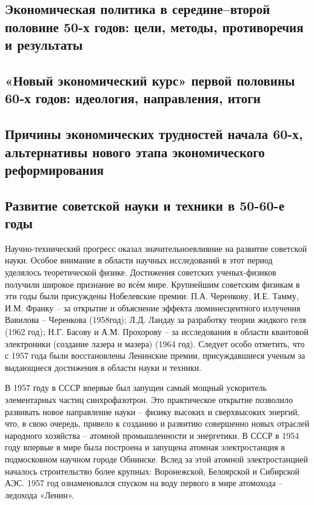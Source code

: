 \documentclass{article}
\begin{document}
\pagebreak
\subsection{Экономическая политика в середине–второй половине 50-х годов: цели, методы, противоречия и результаты}

\pagebreak
\subsection{«Новый экономический курс» первой половины 60-х годов: идеология, направления, итоги}

\pagebreak
\subsection{Причины экономических трудностей начала 60-х, альтернативы нового этапа экономического реформирования}

\pagebreak
\subsection{Развитие советской науки и техники в 50-60-е годы}

Научно-технический прогресс оказал значительноевлияние на развитие советской науки. Особое внимание в области научных исследований в этот период уделялось теоретической физике. Достижения советских ученых-физиков получили широкое признание во всём мире. Крупнейшим советским физикам в эти годы были присуждены Нобелевские премии: П.А. Черенкову, И.Е. Тамму, И.М. Франку – за открытие и объяснение эффекта люминесцентного излучения Вавилова – Черенкова (1958год); Л.Д. Ландау за разработку теории жидкого геля (1962 год); Н.Г. Басову и А.М. Прохорову – за исследования в области квантовой электроники (создание лазера и мазера) (1964 год). Следует особо отметить, что с 1957 года были восстановлены Ленинские премии, присуждавшиеся ученым за выдающиеся достижения в области науки и техники.

\hfill

В 1957 году в СССР впервые был запущен самый мощный ускоритель элементарных частиц синхрофазотрон. Это практическое открытие позволило развивать новое направление науки – физику высоких и сверхвысоких энергий, что, в свою очередь, привело к созданию и развитию совершенно новых отраслей народного хозяйства – атомной промышленности и энергетики. В СССР в 1954 году впервые в мире была построена и запущена атомная электростанция в подмосковном научном городе Обнинске. Вслед за этой атомной электростанцией началось строительство более крупных: Воронежской, Белоярской и Сибирской АЭС. 1957 год ознаменовался спуском на воду первого в мире атомохода – ледохода «Ленин».
\end{document}
